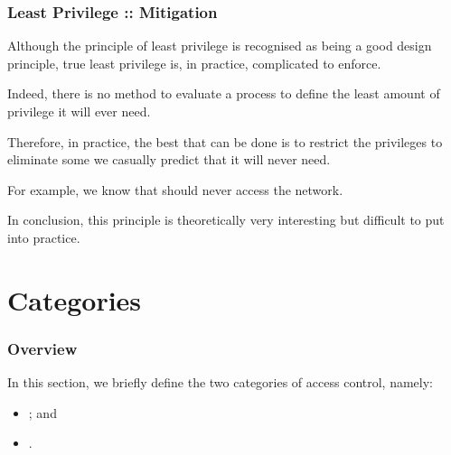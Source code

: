 
\begin{frame}
  \frametitle{Least Privilege :: Mitigation}

  Although the principle of least privilege is recognised as being a
  good design principle, true least privilege is, in practice, complicated
  to enforce.

  \-

  Indeed, there is no method to evaluate a process to define the least
  amount of privilege it will ever need.

  \-

  Therefore, in practice, the best that can be done is to restrict the
  privileges to eliminate some we casually predict that it will never need.

  \-

  For example, we know that  should never access the network.

  \-

  In conclusion, this principle is theoretically very interesting but
  difficult to put into practice.
\end{frame}

%
%

\section{Categories}


\begin{frame}
  \frametitle{Overview}

  In this section, we briefly define the two categories of access control,
  namely:

  \begin{itemize}
    \item
      ; and
    \item
      .
  \end{itemize}
\end{frame}


